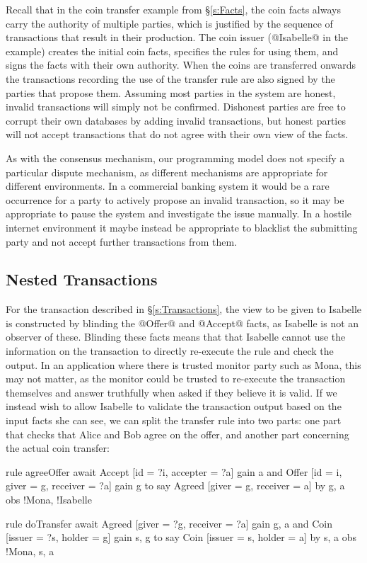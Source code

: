  Recall that in the coin transfer example from \S\ref{s:Facts}, the coin facts always carry the authority of multiple parties, which is justified by the sequence of transactions that result in their production. The coin issuer (@Isabelle@ in the example) creates the initial coin facts, specifies the rules for using them, and signs the facts with their own authority. When the coins are transferred onwards the transactions recording the use of the transfer rule are also signed by the parties that propose them. Assuming most parties in the system are honest, invalid transactions will simply not be confirmed. Dishonest parties are free to corrupt their own databases by adding invalid transactions, but honest parties will not accept transactions that do not agree with their own view of the facts.

 As with the consensus mechanism, our programming model does not specify a particular dispute mechanism, as different mechanisms are appropriate for different environments. In a commercial banking system it would be a rare occurrence for a party to actively propose an invalid transaction, so it may be appropriate to pause the system and investigate the issue manually. In a hostile internet environment it maybe instead be appropriate to blacklist the submitting party and not accept further transactions from them.

\subsection{Nested Transactions}
For the transaction described in \S\ref{s:Transactions}, the view to be given to Isabelle is constructed by blinding the @Offer@ and @Accept@ facts, as Isabelle is not an observer of these. Blinding these facts means that that Isabelle cannot use the information on the transaction to directly re-execute the rule and check the output. In an application where there is trusted monitor party such as Mona, this may not matter, as the monitor could be trusted to re-execute the transaction themselves and answer truthfully when asked if they believe it is valid. If we instead wish to allow Isabelle to validate the transaction output based on the input facts she can see, we can split the transfer rule into two parts: one part that checks that Alice and Bob agree on the offer, and another part concerning the actual coin transfer:

\begin{small}
\begin{code}
  rule  agreeOffer
  await Accept [id = ?i, accepter = ?a]            gain {a}
    and Offer  [id = i,  giver = g, receiver = ?a] gain {g}
  to
   say  Agreed [giver = g,   receiver = a]
    by  {g, a} obs {!Mona, !Isabelle}

  rule  doTransfer
  await Agreed [giver  = ?g, receiver = ?a] gain {g, a}
   and  Coin   [issuer = ?s, holder   = g]  gain {s, g}
  to
   say  Coin   [issuer = s,  holder   = a]
    by  {s, a} obs {!Mona, s, a}
\end{code}
\end{small}


